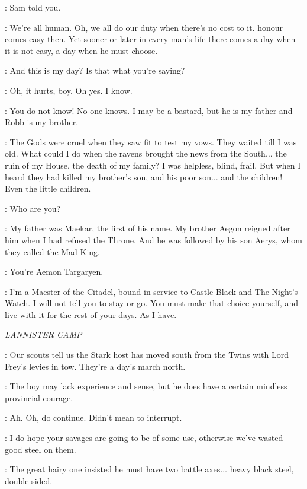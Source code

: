 \JON: Sam told you. 

\AEMON: We're all human. Oh, we all do our duty when there's no cost to it. honour comes easy then. Yet sooner or later in every man's life there comes a day when it is not easy, a day when he must choose. 

\JON: And this is my day? Is that what you're saying? 

\AEMON: Oh, it hurts, boy. Oh yes. I know. 

\JON: You do not know! No one knows.  I may be a bastard, but he is my father and Robb is my brother. 

\AEMON: The Gods were cruel when they saw fit to test my vows. They waited till I was old. What could I do when the ravens brought the news from the South$\ldots$ the ruin of my House, the death of my family? I was helpless, blind, frail. But when I heard they had killed my brother's son, and his poor son$\ldots$ and the children! Even the little children. 

\JON: Who are you? 

\AEMON: My father was Maekar, the first of his name. My brother Aegon reigned after him when I had refused the Throne. And he was followed by his son Aerys, whom they called the Mad King. 

\JON: You're Aemon Targaryen. 

\AEMON: I'm a Maester of the Citadel, bound in service to Castle Black and The Night's Watch. I will not tell you to stay or go. You must make that choice yourself, and live with it for the rest of your days. As I have. 



\scene

\textit{LANNISTER CAMP} 


\KEVAN: Our scouts tell us the Stark host has moved south from the Twins with Lord Frey's levies in tow. They're a day's march north. 

\TYWIN: The boy may lack experience and sense, but he does have a certain mindless provincial courage. 


\TYRION: Ah. Oh, do continue. Didn't mean to interrupt. 

\TYWIN: I do hope your savages are going to be of some use, otherwise we've wasted good steel on them. 

\KEVAN: The great hairy one insisted he must have two battle axes$\ldots$ heavy black steel, double-sided. 

